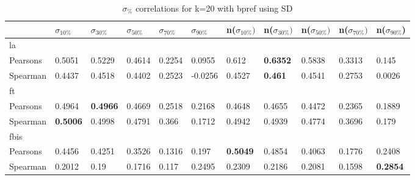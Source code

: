 \documentclass{sig-alternate}
\begin{document}
\begin{table}[h!]
\centering
\begin{tabular}{|l||l|l|l|l|l||l|l|l|l|l|}
\hline
& $\sigma_{10\%}$ & $\sigma_{30\%}$ & $\sigma_{50\%}$ & $\sigma_{70\%}$ & $\sigma_{90\%}$ & n($\sigma_{10\%})$ & n($\sigma_{30\%})$ & n($\sigma_{50\%})$ & n($\sigma_{70\%})$ & n($\sigma_{90\%}$) \\ \hline
\hline la &  &  &  &  &  &  &  &  &  &  \\ \hline
Pearsons & 0.5051 & 0.5229 & 0.4614 & 0.2254 & 0.0955 & 0.612 & \textbf{0.6352} & 0.5838 & 0.3313 & 0.145 \\ \hline
Spearman & 0.4437 & 0.4518 & 0.4402 & 0.2523 & -0.0256 & 0.4527 & \textbf{0.461} & 0.4541 & 0.2753 & 0.0026 \\ \hline
\hline ft &  &  &  &  &  &  &  &  &  &  \\ \hline
Pearsons & 0.4964 & \textbf{0.4966} & 0.4669 & 0.2518 & 0.2168 & 0.4648 & 0.4655 & 0.4472 & 0.2365 & 0.1889 \\ \hline
Spearman & \textbf{0.5006} & 0.4998 & 0.4791 & 0.366 & 0.1712 & 0.4942 & 0.4939 & 0.4774 & 0.3696 & 0.179 \\ \hline
\hline fbis &  &  &  &  &  &  &  &  &  &  \\ \hline
Pearsons & 0.4456 & 0.4251 & 0.3526 & 0.1316 & 0.197 & \textbf{0.5049} & 0.4854 & 0.4063 & 0.1776 & 0.2408 \\ \hline
Spearman & 0.2012 & 0.19 & 0.1716 & 0.117 & 0.2495 & 0.2309 & 0.2186 & 0.2081 & 0.1598 & \textbf{0.2854} \\ \hline
\end{tabular}
\caption{$\sigma_{\%}$ correlations for k=20 with bpref using SD}
\end{table}
\end{document}
